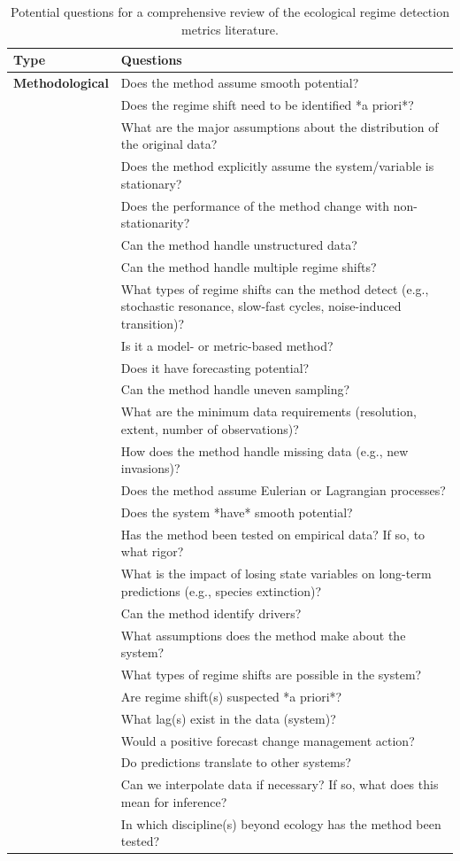 \documentclass[12pt,twoside,openany]{reedthesis}
\begin{document}
\begin{longtable}{>{\bfseries}l|>{\raggedright\arraybackslash}p{30em}}
\caption{\label{tab:nextStepsTab}Potential questions for a comprehensive review of the ecological regime detection metrics literature.}\\
\toprule
Type & Questions\\
\midrule
Methodological & Does the method assume smooth potential?\\
 & Does the regime shift need to be identified *a priori*?\\
 & What are the major assumptions about the distribution of the original data?\\
 & Does the method explicitly assume the system/variable is stationary?\\
 & Does the performance of the method change with non-stationarity?\\
\addlinespace
 & Can the method handle unstructured data?\\
 & Can the method handle multiple regime shifts?\\
 & What types of regime shifts can the method detect (e.g., stochastic resonance, slow-fast cycles, noise-induced transition)?\\
 & Is it a model- or metric-based method?\\
 & Does it have forecasting potential?\\
\addlinespace
 & Can the method handle uneven sampling?\\
 & What are the minimum data requirements (resolution, extent, number of observations)?\\
 & How does the method handle missing data (e.g., new invasions)?\\
 & Does the method assume Eulerian or Lagrangian processes?\\
 & Does the system *have* smooth potential?\\
\addlinespace
 & Has the method been tested on empirical data? If so, to what rigor?\\
 & What is the impact of losing state variables on long-term predictions (e.g., species extinction)?\\
 & Can the method identify drivers?\\
 & What assumptions does the method make about the system?\\
 & What types of regime shifts are possible in the system?\\
\addlinespace
 & Are regime shift(s) suspected *a priori*?\\
 & What lag(s) exist in the data (system)?\\
 & Would a positive forecast change management action?\\
 & Do predictions translate to other systems?\\
 & Can we interpolate data if necessary? If so, what does this mean for inference?\\
\addlinespace
 & In which discipline(s) beyond ecology has the method been tested?\\
\bottomrule
\end{longtable}
\end{document}
